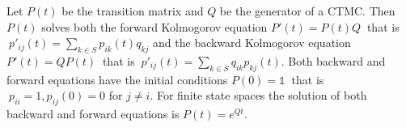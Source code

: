  Let $P(t)$ be the transition matrix and $Q$ be the generator of a CTMC. Then $P(t)$ solves both the forward Kolmogorov equation
$P'(t) = P(t)Q\ $ that is $\ p'_{ij}(t) = \sum_{k \in S} p_{ik}(t) q_{kj}$ and the backward Kolmogorov equation
$P'(t) = QP(t)\ $ that is $\ p'_{ij}(t) = \sum_{k \in S} q_{ik}p_{kj}(t).$
Both backward and forward equations have the initial conditions 
$P(0) = \mathbb{1}\ $ that is $\ p_{ii} = 1, p_{ij}(0) = 0$ for $j \ne i$.
 For finite state spaces the solution of both backward and forward equations is $P(t) = e^{Qt}.$